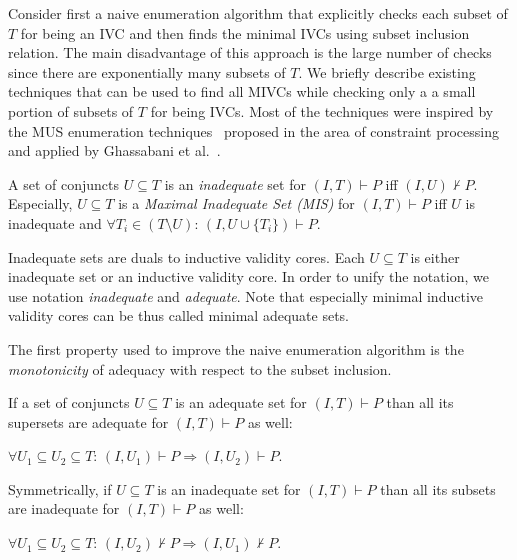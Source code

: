 \newcommand{\fUnex}{f_{\mathit{Unexplored}}}
Consider first
a naive enumeration algorithm that   explicitly checks each subset of $T$ for being an IVC  and then finds the minimal IVCs  using subset inclusion relation. The main disadvantage of this approach is the large number of checks since there are exponentially many subsets of $T$.
We briefly describe existing techniques that can be used to find all MIVCs while checking only a a small portion of subsets of $T$  for being IVCs.  Most of the techniques were inspired by the MUS enumeration techniques~\cite{Liffiton2016,bacchus2015using,belov2012muser2,nadel2014accelerated,DBLP:conf/sefm/BendikBBC16,DBLP:conf/fsttcs/BendikBCB16}   proposed in the area of constraint processing and applied by Ghassabani et al.~\cite{Ghass17AllIVCs,Ghass16}.


\begin{definition}[Inadequacy] A set of conjuncts  $U \subseteq T$  is an \emph{inadequate} set for $(I, T) \vdash P$ iff $(I, U) \nvdash P$. Especially, $U \subseteq T$ is a \emph{Maximal Inadequate Set (MIS)} for $(I, T) \vdash P$ iff $U$ is inadequate and $\forall T_i \in (T \setminus U): \, (I, U \cup \{ T_i\}) \vdash P$.
\end{definition}

Inadequate sets are duals to inductive validity cores. Each $U \subseteq T$ is either inadequate set or an inductive validity core. In order to unify the notation, we   use notation \emph{inadequate} and \emph{adequate}. Note that especially minimal inductive validity cores can be thus called  minimal adequate sets.



The first property used to improve the naive enumeration algorithm is the \emph{monotonicity} of  adequacy   with respect to the subset inclusion.

\begin{lemma}[Monotonicity]
\label{lemma:monotonicity}
If a set of conjuncts  $U \subseteq T$  is an adequate set for $(I, T) \vdash P$   than all its supersets are adequate for  $(I, T) \vdash P$ as well:
\begin{center}
$\forall U_1 \subseteq U_2 \subseteq T: \, (I, U_1) \vdash P \Rightarrow (I, U_2) \vdash P$.
\end{center}
Symmetrically, if   $U \subseteq T$  is an inadequate set for $(I, T) \vdash P$   than all its subsets are inadequate for  $(I, T) \vdash P$ as well:
\begin{center}
$\forall U_1 \subseteq U_2 \subseteq T: \, (I, U_2) \nvdash P \Rightarrow (I, U_1) \nvdash P$.
\end{center}
\end{lemma}

